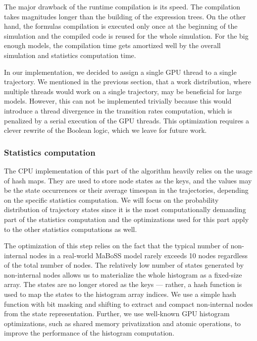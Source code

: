 \documentclass[times, twoside]{zHenriquesLab-StyleBioRxiv}
\begin{document}
The major drawback of the runtime compilation is its speed. The compilation takes magnitudes longer than the building of the expression trees. On the other hand, the formulas compilation is executed only once at the beginning of the simulation and the compiled code is reused for the whole simulation. For the big enough models, the compilation time gets amortized well by the overall simulation and statistics computation time.

In our implementation, we decided to assign a single GPU thread to a single trajectory. We mentioned in the previous section, that a work distribution, where multiple threads would work on a single trajectory, may be beneficial for large models. However, this can not be implemented trivially because this would introduce a thread divergence in the transition rates computation, which is penalized by a serial execution of the GPU threads. This optimization requires a clever rewrite of the Boolean logic, which we leave for future work.

\subsubsection*{Statistics computation}

The CPU implementation of this part of the algorithm heavily relies on the usage of hash maps. They are used to store node states as the keys, and the values may be the state occurrences or their average timespan in the trajectories, depending on the specific statistics computation. We will focus on the probability distribution of trajectory states since it is the most computationally demanding part of the statistics computation and the optimizations used for this part apply to the other statistics computations as well.

The optimization of this step relies on the fact that the typical number of non-internal nodes in a real-world MaBoSS model rarely exceeds 10 nodes regardless of the total number of nodes. The relatively low number of states generated by non-internal nodes allows us to materialize the whole histogram as a fixed-size array. The states are no longer stored as the keys --- rather, a hash function is used to map the states to the histogram array indices. We use a simple hash function with bit masking and shifting to extract and compact non-internal nodes from the state representation. Further, we use well-known GPU histogram optimizations, such as shared memory privatization and atomic operations, to improve the performance of the histogram computation.
\end{document}
